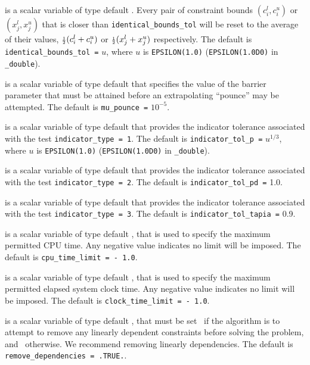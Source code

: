 \begin{description}
is a scalar variable of type default \realdp.
Every pair of constraint bounds
$(c_{i}^{l}, c_{i}^{u})$ or $(x_{j}^{l}, x_{j}^{u})$
that is closer than {\tt identical\_bounds\_tol}
will be reset to the average of their values,
${\scriptstyle \frac{1}{2}} (c_{i}^{l} + c_{i}^{u})$ or ${\scriptstyle \frac{1}{2}} (x_{j}^{l} + x_{j}^{u})$
respectively.
The default is {\tt identical\_bounds\_tol =} $u$,
where $u$ is {\tt EPSILON(1.0)} ({\tt EPSILON(1.0D0)} in
{\tt \fullpackagename\_double}).

is a scalar variable of type default \realdp that specifies
the value of the barrier parameter that must be attained before an 
extrapolating ``pounce'' may be attempted.
The default is {\tt mu\_pounce =} $10^{-5}$.

is a scalar variable of type default \realdp that
provides the indicator tolerance associated with the test
{\tt indicator\_type = 1}.
The default is {\tt indicator\_tol\_p =} $u^{1/3}$,
where $u$ is {\tt EPSILON(1.0)} ({\tt EPSILON(1.0D0)} in
{\tt \fullpackagename\_double}).

is a scalar variable of type default \realdp that
provides the indicator tolerance associated with the test
{\tt indicator\_type = 2}.
The default is {\tt indicator\_tol\_pd =} 1.0.

is a scalar variable of type default \realdp that
provides the indicator tolerance associated with the test
{\tt indicator\_type = 3}.
The default is {\tt indicator\_tol\-\_tapia =} 0.9.

 is a scalar variable of type default \realdp,
that is used to specify the maximum permitted CPU time. Any negative
value indicates no limit will be imposed. The default is
{\tt cpu\_time\_limit = - 1.0}.

 is a scalar variable of type default \realdp,
that is used to specify the maximum permitted elapsed system clock time.
Any negative value indicates no limit will be imposed. The default is
{\tt clock\_time\_limit = - 1.0}.

 is a scalar variable of type
default \logical, that must be set \true\ if the algorithm
is to attempt to remove any linearly dependent constraints before
solving the problem, and \false\ otherwise.
We recommend removing linearly dependencies.
The default is {\tt remove\_dependencies = .TRUE.}.


\end{description}
